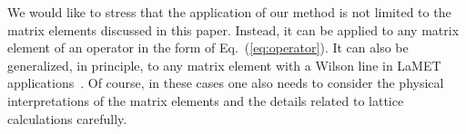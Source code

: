We would like to stress that the application of our method is not limited to the matrix elements discussed in this paper. Instead, it can be applied to any matrix element of an operator in the form of Eq.~(\ref{eq:operator}). %
It can also be generalized, in principle, to any matrix element with a Wilson line
in LaMET applications~\cite{Ji:2020ect}. Of course, in these cases one also needs to consider the physical interpretations of the matrix elements and the details related to lattice calculations carefully.  

 

~\\
~\\
~\\
~\\
~\\
~\\
~\\
~\\
